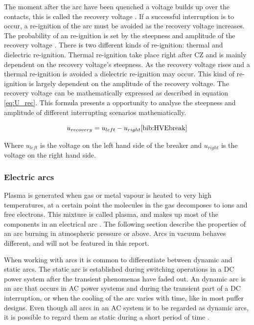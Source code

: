 \documentclass[10pt,a4paper]{article} %
\begin{document}
The moment after the arc have been quenched a voltage builds up over the contacts, this is called the recovery voltage \cite{bib:HVEbreak}. If a successful interruption is to occur, a re-ignition of the arc must be avoided as the recovery voltage increases. The probability of an re-ignition is set by the steepness and amplitude of the recovery voltage \cite{bib:HVEbreak}. There is two different kinds of re-ignition: thermal and dielectric re-ignition. Thermal re-ignition take place right after CZ and is mainly dependent on the recovery voltage's steepness. As the recovery voltage rises and a thermal re-ignition is avoided a dielectric re-ignition may occur. This kind of re-ignition is largely dependent on the amplitude of the recovery voltage. The recovery voltage can be mathematically expressed as described in equation \eqref{eq:U_rec}. This formula presents a opportunity to analyse the steepness and amplitude of different interrupting scenarios mathematically.

\begin{equation} \label{eq:U_rec}
u_{recovery}=u_{left}-u_{right} \cite{bib:HVEbreak}
\end{equation} 

Where $u_{left}$ is the voltage on the left hand side of the breaker and $u_{right}$ is the voltage on the right hand side.

\subsubsection{Electric arcs}
Plasma is generated when gas or metal vapour is heated to very high temperatures, at a certain point the molecules in the gas decomposes to ions and free electrons. This mixture is called plasma, and makes up most of the components in an electrical arc \cite{bib:HVEbreak}. The following section describe the properties of an arc burning in atmospheric pressure or above. Arcs in vacuum behaves different, and will not be featured in this report.

When working with arcs it is common to differentiate between dynamic and static arcs. The static arc is established during switching operations in a DC power system after the transient phenomenas have faded out. An dynamic arc is an arc that occurs in AC power systems and during the transient part of a DC interruption, or when the cooling of the arc varies with time, like in most puffer designs. Even though all arcs in an AC system is to be regarded as dynamic arcs, it is possible to regard them as static during a short period of time \cite{bib:HVEbreak}.
\end{document}
